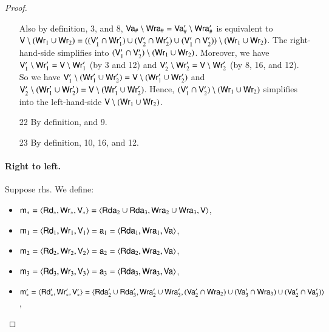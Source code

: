 \begin{proof}
\begin{itemize}
  Also by definition, 3, and 8, $\mathsf {Va}_\# \setminus \mathsf {Wra}_\# = \mathsf {Va}'_\# \setminus \mathsf {Wra}'_\#$ is equivalent to $\mathsf{V} \setminus (\mathsf{Wr}_1 \cup \mathsf{Wr}_2) = ((\mathsf{V}'_1 \cap \mathsf{Wr}'_1) \cup (\mathsf{V}'_2 \cap \mathsf{Wr}'_2) \cup (\mathsf{V}'_1 \cap \mathsf{V}'_2)) \setminus (\mathsf{Wr}_1 \cup \mathsf{Wr}_2)$. The right-hand-side simplifies into $(\mathsf{V}'_1 \cap \mathsf{V}'_2) \setminus (\mathsf{Wr}_1 \cup \mathsf{Wr}_2)$. Moreover, we have $\mathsf{V}'_1 \setminus \mathsf{Wr}'_1 = \mathsf{V} \setminus \mathsf{Wr}'_1$ (by 3 and 12) and $\mathsf{V}'_2 \setminus \mathsf{Wr}'_2 = \mathsf{V} \setminus \mathsf{Wr}'_2$ (by 8, 16, and 12). So we have $\mathsf{V}'_1 \setminus (\mathsf{Wr}'_1 \cup \mathsf{Wr}'_2) = \mathsf{V} \setminus (\mathsf{Wr}'_1 \cup \mathsf{Wr}'_2)$ and $\mathsf{V}'_2 \setminus (\mathsf{Wr}'_1 \cup \mathsf{Wr}'_2) = \mathsf{V} \setminus (\mathsf{Wr}'_1 \cup \mathsf{Wr}'_2)$. Hence, $(\mathsf{V}'_1 \cap \mathsf{V}'_2) \setminus (\mathsf{Wr}_1 \cup \mathsf{Wr}_2)$ simplifies into the left-hand-side $\mathsf{V} \setminus (\mathsf{Wr}_1 \cup \mathsf{Wr}_2)$.
\item[22] By definition, and 9.
\item[23] By definition, 10, 16, and 12.
\end{itemize}


\paragraph{Right to left.}

Suppose rhs. We define:
\begin{itemize}
\item $\mathsf m_* = \langle \mathsf{Rd}_*, \mathsf{Wr}_*, \mathsf{V}_* \rangle = \langle \mathsf {Rda}_2 \cup \mathsf {Rda}_3, \mathsf {Wra}_2 \cup \mathsf {Wra}_3, \mathsf{V} \rangle$,

\item $\mathsf m_1 = \langle \mathsf{Rd}_1, \mathsf{Wr}_1, \mathsf{V}_1 \rangle = \mathsf a_1 = \langle \mathsf {Rda}_1, \mathsf {Wra}_1, \mathsf {Va} \rangle$,
\item $\mathsf m_2 = \langle \mathsf{Rd}_2, \mathsf{Wr}_2, \mathsf{V}_2 \rangle = \mathsf a_2 = \langle \mathsf {Rda}_2, \mathsf {Wra}_2, \mathsf {Va} \rangle$,
\item $\mathsf m_3 = \langle \mathsf{Rd}_3, \mathsf{Wr}_3, \mathsf{V}_3 \rangle = \mathsf a_3 = \langle \mathsf {Rda}_3, \mathsf {Wra}_3, \mathsf {Va} \rangle$,  

\item $\mathsf m'_* = \langle \mathsf{Rd}'_*, \mathsf{Wr}'_*, \mathsf{V}'_* \rangle = \langle \mathsf {Rda}'_2 \cup \mathsf {Rda}'_3, \mathsf {Wra}'_2 \cup \mathsf {Wra}'_3, (\mathsf {Va}'_2 \cap \mathsf {Wra}_2) \cup (\mathsf {Va}'_3 \cap \mathsf {Wra}_3) \cup (\mathsf {Va}'_2 \cap \mathsf {Va}'_3) \rangle$,
  

\end{itemize}
\end{proof}

